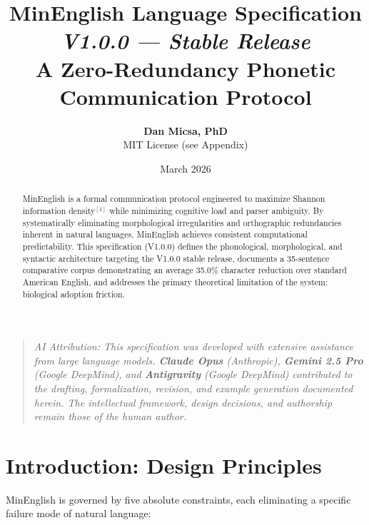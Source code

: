 \documentclass[10pt,onecolumn,letterpaper]{article}
\title{\Huge\textbf{MinEnglish Language Specification}\\[0.2em]
\LARGE\textit{V1.0.0 --- Stable Release}\\[0.3em]
\large A Zero-Redundancy Phonetic Communication Protocol}
\author{\textbf{Dan Micsa, PhD}\\
\small MIT License (see Appendix)}
\date{March 2026}
\begin{document}
\maketitle

\begin{quote}
\small\textit{AI Attribution: This specification was developed with extensive
assistance from large language models. \textbf{Claude Opus} (Anthropic),
\textbf{Gemini 2.5 Pro} (Google DeepMind), and \textbf{Antigravity} (Google
DeepMind) contributed to the drafting, formalization, revision, and example
generation documented herein. The intellectual framework, design decisions,
and authorship remain those of the human author.}
\end{quote}

\begin{abstract}
MinEnglish is a formal communication protocol engineered to maximize Shannon
information density$^{[1]}$ while minimizing cognitive load and parser
ambiguity. By systematically eliminating morphological irregularities and
orthographic redundancies inherent in natural languages, MinEnglish achieves
consistent computational predictability. This specification (V1.0.0) defines
the phonological, morphological, and syntactic architecture targeting the
V1.0.0 stable release, documents a 35-sentence comparative corpus
demonstrating an average 35.0\% character reduction over standard American
English, and addresses the primary theoretical limitation of the system:
biological adoption friction.
\end{abstract}

\tableofcontents
\vspace{1em}

\section{Introduction: Design Principles}

MinEnglish is governed by five absolute constraints, each eliminating a
specific failure mode of natural language:
\end{document}
